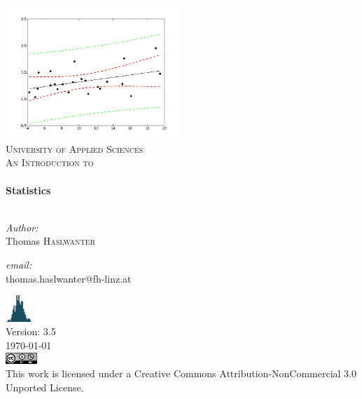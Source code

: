 \begin{titlepage}

\begin{center}


\includegraphics[width=0.5\textwidth]{../Images/regression.png}\\[1cm]

\textsc{\LARGE University of Applied Sciences }\\[1.5cm]

\textsc{\Large An Introduction to}\\[0.5cm]


\HRule \\[0.4cm]
{ \huge \bfseries Statistics}\\[0.4cm]

\HRule \\[1.5cm]

\begin{minipage}{0.4\textwidth}
\begin{flushleft} \large
\emph{Author:}\\
Thomas \textsc{Haslwanter}
\end{flushleft}
\end{minipage}
\begin{minipage}{0.4\textwidth}
\begin{flushright} \large
\emph{email:} \\
{\small thomas.haslwanter@fh-linz.at}
\end{flushright}
\end{minipage}

\vfill

\includegraphics[width=1cm]{../Images/StatsLogo_green.png}\\
Version: 3.5 \\
{\large \today} \\[1cm]
\includegraphics[width=1.2cm]{../Images/cc_licence.png}\\
\footnotesize{This work is licensed under a Creative Commons Attribution-NonCommercial 3.0 Unported License.}


\end{center}

\end{titlepage}
